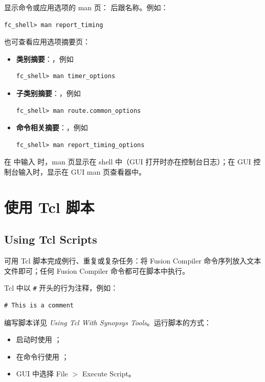 显示命令或应用选项的 man 页： 后跟名称。例如：
\begin{lstlisting}
fc_shell> man report_timing
\end{lstlisting}

也可查看应用选项摘要页：
\begin{itemize}
  \item \textbf{类别摘要}：，例如
\begin{lstlisting}
fc_shell> man timer_options
\end{lstlisting}
  \item \textbf{子类别摘要}：，例如
\begin{lstlisting}
fc_shell> man route.common_options
\end{lstlisting}
  \item \textbf{命令相关摘要}：，例如
\begin{lstlisting}
fc_shell> man report_timing_options
\end{lstlisting}
\end{itemize}

在  中输入  时，man 页显示在 shell 中（GUI 打开时亦在控制台日志）；在 GUI 控制台输入时，显示在 GUI man 页查看器中。

\section{使用 Tcl 脚本}
\subsection*{Using Tcl Scripts}

可用 Tcl 脚本完成例行、重复或复杂任务：将 Fusion Compiler 命令序列放入文本文件即可；任何 Fusion Compiler 命令都可在脚本中执行。

Tcl 中以 \texttt{\#} 开头的行为注释，例如：
\begin{lstlisting}
# This is a comment
\end{lstlisting}

编写脚本详见 \textit{Using Tcl With Synopsys Tools}。运行脚本的方式：
\begin{itemize}
  \item 启动时使用 ；
  \item 在命令行使用 ；
  \item GUI 中选择 File $>$ Execute Script。
\end{itemize}

